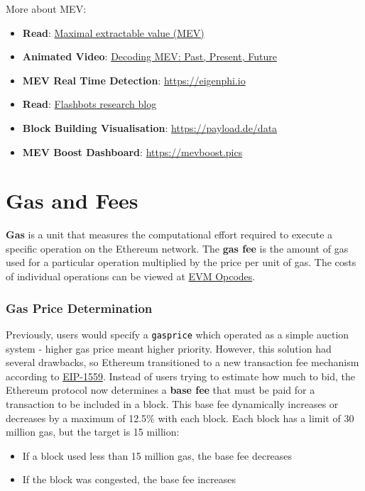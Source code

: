 \documentclass[12pt]{article}
\newcommand{\codegrey}[1]{%
  \texttt{\colorbox{black!4}{\textcolor{black}{#1}}}%
}
\begin{document}
\medskip
\noindent
More about MEV:
\begin{itemize}
  \item \textbf{Read}: \href{https://ethereum.org/en/developers/docs/mev/}{Maximal extractable value (MEV)}
  \item \textbf{Animated Video}: \href{https://www.youtube.com/watch?v=F9IuBZGseFQ}{Decoding MEV: Past, Present, Future}
  \item \textbf{MEV Real Time Detection}: \href{https://eigenphi.io/}{https://eigenphi.io}
  \item \textbf{Read}: \href{https://www.flashbots.net/}{Flashbots research blog}
  \item \textbf{Block Building Visualisation}: \href{https://payload.de/data/}{https://payload.de/data}
  \item \textbf{MEV Boost Dashboard}: \href{https://mevboost.pics/}{https://mevboost.pics}
\end{itemize}

\section{Gas and Fees}

\textbf{Gas} is a unit that measures the computational effort required to execute a specific operation on the Ethereum network. The \textbf{gas fee} is the amount of gas used for a particular operation multiplied by the price per unit of gas. The costs of individual operations can be viewed at \href{https://ethereum.org/en/developers/docs/evm/opcodes/}{EVM Opcodes}.

\subsubsection*{Gas Price Determination}

Previously, users would specify a \codegrey{gasprice} which operated as a simple auction system - higher gas price meant higher priority. However, this solution had several drawbacks, so Ethereum transitioned to a new transaction fee mechanism according to \href{https://eips.ethereum.org/EIPS/eip-1559}{EIP-1559}. Instead of users trying to estimate how much to bid, the Ethereum protocol now determines a \textbf{base fee} that must be paid for a transaction to be included in a block. This base fee dynamically increases or decreases by a maximum of 12.5\% with each block. Each block has a limit of 30 million gas, but the target is 15 million:

\begin{itemize}
    \item If a block used less than 15 million gas, the base fee decreases
    \item If the block was congested, the base fee increases
\end{itemize}
\end{document}
